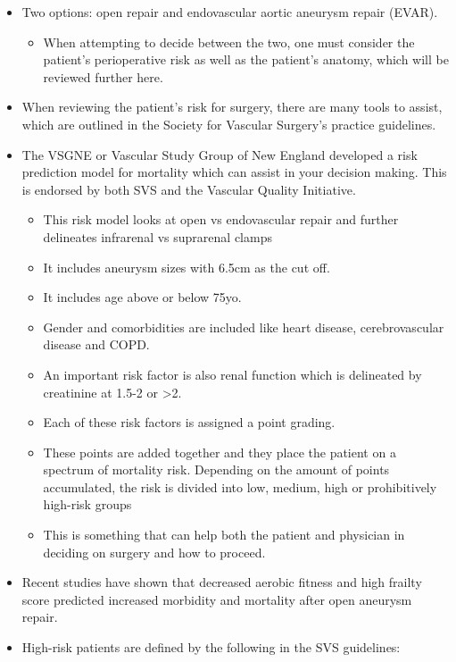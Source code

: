 \documentclass[
]{book}
\providecommand{\tightlist}{%
  \setlength{\itemsep}{0pt}\setlength{\parskip}{0pt}}
\begin{document}
\begin{itemize}
\item
  Two options: open repair and endovascular aortic aneurysm repair
  (EVAR).

  \begin{itemize}
  \tightlist
  \item
    When attempting to decide between the two, one must consider the
    patient's perioperative risk as well as the patient's anatomy,
    which will be reviewed further here.
  \end{itemize}
\item
  When reviewing the patient's risk for surgery, there are many tools
  to assist, which are outlined in the Society for Vascular Surgery's
  practice guidelines.
\item
  The VSGNE or Vascular Study Group of New England developed a risk
  prediction model for mortality which can assist in your decision
  making. This is endorsed by both SVS and the Vascular Quality
  Initiative.\citep{chaikof2018, eslami2015}

  \begin{itemize}
  \item
    This risk model looks at open vs endovascular repair and further
    delineates infrarenal vs suprarenal clamps
  \item
    It includes aneurysm sizes with 6.5cm as the cut off.
  \item
    It includes age above or below 75yo.
  \item
    Gender and comorbidities are included like heart disease,
    cerebrovascular disease and COPD.
  \item
    An important risk factor is also renal function which is
    delineated by creatinine at 1.5-2 or \textgreater2.
  \item
    Each of these risk factors is assigned a point grading.
  \item
    These points are added together and they place the patient on a
    spectrum of mortality risk. Depending on the amount of points
    accumulated, the risk is divided into low, medium, high or
    prohibitively high-risk groups
  \item
    This is something that can help both the patient and physician
    in deciding on surgery and how to proceed.
  \end{itemize}
\item
  Recent studies have shown that decreased aerobic fitness and high
  frailty score predicted increased morbidity and mortality after open
  aneurysm repair.
\item
  High-risk patients are defined by the following in the SVS
  guidelines:


\end{itemize}
\end{document}

